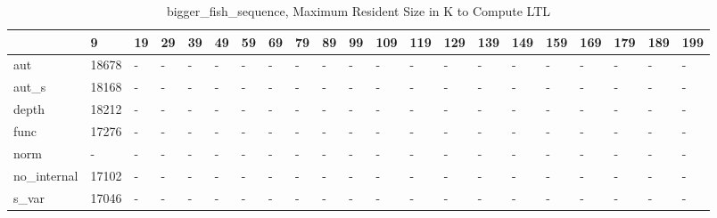 \begin{table}
\caption{bigger_fish_sequence, Maximum Resident Size in K to Compute LTL}
\label{bigger_fish_sequence_LTL_size}
\begin{tabular}{lllllllllllllllllllll}
\toprule
 & 9 & 19 & 29 & 39 & 49 & 59 & 69 & 79 & 89 & 99 & 109 & 119 & 129 & 139 & 149 & 159 & 169 & 179 & 189 & 199 \\
\midrule
aut & 18678 & - & - & - & - & - & - & - & - & - & - & - & - & - & - & - & - & - & - & - \\
aut_s & 18168 & - & - & - & - & - & - & - & - & - & - & - & - & - & - & - & - & - & - & - \\
depth & 18212 & - & - & - & - & - & - & - & - & - & - & - & - & - & - & - & - & - & - & - \\
func & 17276 & - & - & - & - & - & - & - & - & - & - & - & - & - & - & - & - & - & - & - \\
norm & - & - & - & - & - & - & - & - & - & - & - & - & - & - & - & - & - & - & - & - \\
no_internal & 17102 & - & - & - & - & - & - & - & - & - & - & - & - & - & - & - & - & - & - & - \\
s_var & 17046 & - & - & - & - & - & - & - & - & - & - & - & - & - & - & - & - & - & - & - \\
\bottomrule
\end{tabular}
\end{table}
